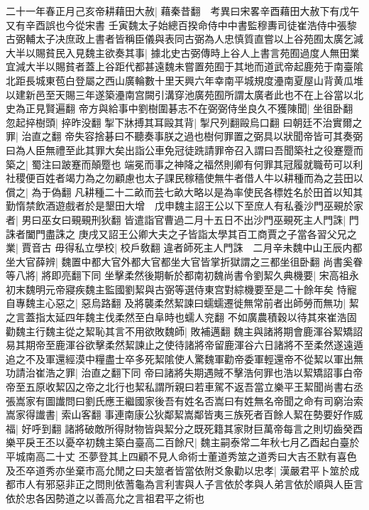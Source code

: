 二十一年春正月己亥帝耕藉田大赦|{
	藉秦昔翻　考異曰宋畧辛酉藉田大赦下有戊午又有辛酉誤也今從宋書}
壬寅魏太子始總百揆命侍中中書監穆夀司徒崔浩侍中張黎古弼輔太子决庶政上書者皆稱臣儀與表同古弼為人忠慎質直嘗以上谷苑囿太廣乞減大半以賜貧民入見魏主欲奏其事|{
	據北史古弼傳時上谷人上書言苑囿過度人無田業宜減大半以賜貧者蓋上谷距代都甚遠魏未嘗置苑囿于其地而道武帝起鹿苑于南臺隂北距長城東苞白登屬之西山廣輪數十里天興六年幸南平城規度灅南夏屋山背黄瓜堆以建新邑至天賜三年遂築灅南宫闕引溝穿池廣苑囿所謂太廣者此也不在上谷當以北史為正見賢遍翻}
帝方與給事中劉樹圍碁志不在弼弼侍坐良久不獲陳聞|{
	坐徂卧翻}
忽起捽樹頭|{
	捽昨没翻}
掣下牀搏其耳毆其背|{
	掣尺列翻毆烏口翻}
曰朝廷不治實爾之罪|{
	治直之翻}
帝失容捨碁曰不聽奏事朕之過也樹何罪置之弼具以狀聞帝皆可其奏弼曰為人臣無禮至此其罪大矣出詣公車免冠徒跣請罪帝召入謂曰吾聞築社之役蹇蹷而築之|{
	蜀注曰跛蹇而顛蹷也}
端冕而事之神降之福然則卿有何罪其冠履就職苟可以利社稷便百姓者竭力為之勿顧慮也太子課民稼穡使無牛者借人牛以耕種而為之芸田以償之|{
	為于偽翻}
凡耕種二十二畝而芸七畝大略以是為率使民各標姓名於田首以知其勤惰禁飲酒遊戲者於是墾田大增　戊申魏主詔王公以下至庶人有私養沙門巫覡於家者|{
	男曰巫女曰覡覡刑狄翻}
皆遣詣官曹過二月十五日不出沙門巫覡死主人門誅|{
	門誅者闔門盡誅之}
庚戌又詔王公卿大夫之子皆詣太學其百工商賈之子當各習父兄之業|{
	賈音古}
毋得私立學校|{
	校戶敎翻}
違者師死主人門誅　二月辛未魏中山王辰内都坐大官薛辨|{
	魏置中都大官外都大官都坐大官皆掌折獄謂之三都坐徂卧翻}
尚書奚眷等八將|{
	將即亮翻下同}
坐擊柔然後期斬於都南初魏尚書令劉絜久典機要|{
	宋高祖永初末魏明元帝寢疾魏主監國劉絜與古弼等選侍東宫對綜機要至是二十餘年矣}
恃寵自專魏主心惡之|{
	惡烏路翻}
及將襲柔然絜諫曰蠕蠕遷徙無常前者出師勞而無功|{
	絜之言蓋指太延四年魏主伐柔然至白阜時也蠕人兖翻}
不如廣農積穀以待其來崔浩固勸魏主行魏主從之絜恥其言不用欲敗魏師|{
	敗補邁翻}
魏主與諸將期會鹿渾谷絜矯詔易其期帝至鹿渾谷欲擊柔然絜諫止之使待諸將帝留鹿渾谷六日諸將不至柔然遂遠遁追之不及軍還經漠中糧盡士卒多死絜隂使人驚魏軍勸帝委軍輕還帝不從絜以軍出無功請治崔浩之罪|{
	治直之翻下同}
帝曰諸將失期遇賊不擊浩何罪也浩以絜矯詔事白帝帝至五原收絜囚之帝之北行也絜私謂所親曰若車駕不返吾當立樂平王絜聞尚書右丞張嵩家有圖䜟問曰劉氏應王繼國家後吾有姓名否嵩曰有姓無名帝聞之命有司窮治索嵩家得䜟書|{
	索山客翻}
事連南康公狄鄰絜嵩鄰皆夷三族死者百餘人絜在勢要好作威福|{
	好呼到翻}
諸將破敵所得財物皆與絜分之既死籍其家財巨萬帝每言之則切齒癸酉樂平戾王丕以憂卒初魏主築白臺高二百餘尺|{
	魏主嗣泰常二年秋七月乙酉起白臺於平城南高二十丈}
丕夢登其上四顧不見人命術士董道秀筮之道秀曰大吉丕默有喜色及丕卒道秀亦坐棄市高允閒之曰夫筮者皆當依附爻象勸以忠孝|{
	漢嚴君平卜筮於成都市人有邪惡非正之問則依蓍龜為言利害與人子言依於孝與人弟言依於順與人臣言依於忠各因勢道之以善高允之言祖君平之術也}
